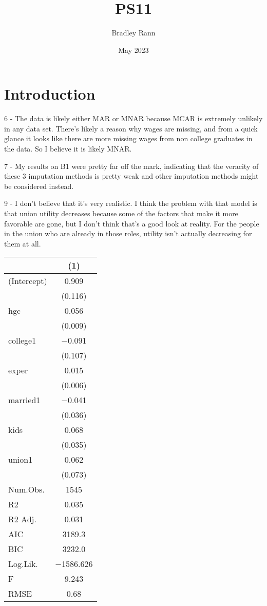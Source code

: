 \documentclass{article}
\title{PS11}
\author{Bradley Rann }
\date{May 2023}
\begin{document}
\maketitle

\section{Introduction}
6 - The data is likely either MAR or MNAR because MCAR is extremely unlikely in any data set. There's likely a reason why wages are missing, and from a quick glance it looks like there are more missing wages from non college graduates in the data. So I believe it is likely MNAR.


7 - My results on B1 were pretty far off the mark, indicating that the veracity of these 3 imputation methods is pretty weak and other imputation methods might be considered instead.


9 - I don't believe that it's very realistic. I think the problem with that model is that union utility decreases because some of the factors that make it more favorable are gone, but I don't think that's a good look at reality. For the people in the union who are already in those roles, utility isn't actually decreasing for them at all.


\begin{table}
\centering
\begin{tabular}[t]{lc}
\toprule
  & (1)\\
\midrule
(Intercept) & \num{0.909}\\
 & (\num{0.116})\\
hgc & \num{0.056}\\
 & (\num{0.009})\\
college1 & \num{-0.091}\\
 & (\num{0.107})\\
exper & \num{0.015}\\
 & (\num{0.006})\\
married1 & \num{-0.041}\\
 & (\num{0.036})\\
kids & \num{0.068}\\
 & (\num{0.035})\\
union1 & \num{0.062}\\
 & (\num{0.073})\\
\midrule
Num.Obs. & \num{1545}\\
R2 & \num{0.035}\\
R2 Adj. & \num{0.031}\\
AIC & \num{3189.3}\\
BIC & \num{3232.0}\\
Log.Lik. & \num{-1586.626}\\
F & \num{9.243}\\
RMSE & \num{0.68}\\
\bottomrule
\end{tabular}
\end{table}
\end{document}
